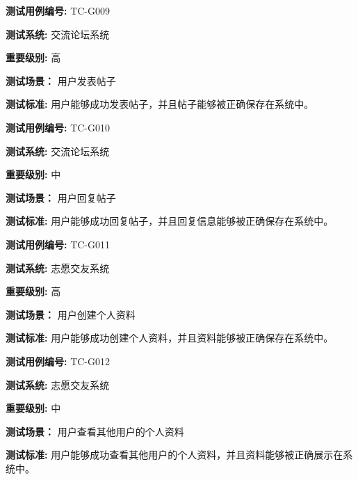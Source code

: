 \begin{framed} \textbf{测试用例编号:} TC-G009

\textbf{测试系统:} 交流论坛系统

\textbf{重要级别:} 高

\textbf{测试场景：} 用户发表帖子

\textbf{测试标准:} 用户能够成功发表帖子，并且帖子能够被正确保存在系统中。

\begin{center}  \end{center} \end{framed}

\begin{framed} \textbf{测试用例编号:} TC-G010

\textbf{测试系统:} 交流论坛系统

\textbf{重要级别:} 中

\textbf{测试场景：} 用户回复帖子

\textbf{测试标准:} 用户能够成功回复帖子，并且回复信息能够被正确保存在系统中。

\begin{center}  \end{center} \end{framed}

\begin{framed} \textbf{测试用例编号:} TC-G011

\textbf{测试系统:} 志愿交友系统

\textbf{重要级别:} 高

\textbf{测试场景：} 用户创建个人资料

\textbf{测试标准:} 用户能够成功创建个人资料，并且资料能够被正确保存在系统中。

\begin{center}  \end{center} \end{framed}

\begin{framed} \textbf{测试用例编号:} TC-G012

\textbf{测试系统:} 志愿交友系统

\textbf{重要级别:} 中

\textbf{测试场景：} 用户查看其他用户的个人资料

\textbf{测试标准:} 用户能够成功查看其他用户的个人资料，并且资料能够被正确展示在系统中。

\begin{center}  \end{center} \end{framed}

